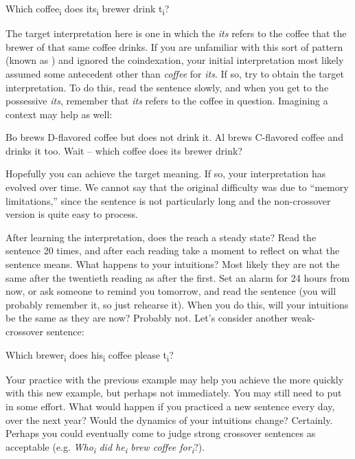 \ea
Which coffee\textsubscript{i} does its\textsubscript{i} brewer drink t\textsubscript{i}?
\z

  The target interpretation here is one in which the  \textit{its} refers to the coffee that the brewer of that same coffee drinks. If you are unfamiliar with this sort of pattern (known as ) and ignored the coindexation, your initial interpretation most likely assumed some antecedent other than \textit{coffee} for \textit{its}. If so, try to obtain the target  interpretation. To do this, read the sentence slowly, and when you get to the possessive  \textit{its}, remember that \textit{its} refers to the coffee in question. Imagining a context may help as well:

\ea
\begin{exe}
  {Bo brews D-flavored coffee but does not drink it. Al brews C-flavored coffee and drinks it too.} 
  {Wait -- which coffee does its brewer drink?}
\end{exe}
\z

  Hopefully you can achieve the target  meaning. If so, your interpretation has evolved over time. We cannot say that the original difficulty was due to “memory limitations,” since the sentence is not particularly long and the non-crossover version is quite easy to process. 

  After learning the  interpretation, does the  reach a steady state? Read the sentence 20 times, and after each reading take a moment to reflect on what the sentence means. What happens to your intuitions? Most likely they are not the same after the twentieth reading as after the first. Set an alarm for 24 hours from now, or ask someone to remind you tomorrow, and read the sentence (you will probably remember it, so just rehearse it). When you do this, will your intuitions be the same as they are now? Probably not. Let's consider another weak-crossover sentence: 

\ea
Which brewer\textsubscript{i} does his\textsubscript{i} coffee please t\textsubscript{i}?
\z

  Your practice with the previous example may help you achieve the  more quickly with this new example, but perhaps not immediately. You may still need to put in some effort. What would happen if you practiced a new  sentence every day, over the next year? Would the dynamics of your intuitions change? Certainly. Perhaps you could eventually come to judge strong crossover sentences as acceptable (e.g. \textit{Who\textsubscript{i} did he\textsubscript{i} brew coffee for\textsubscript{i}}?). 


